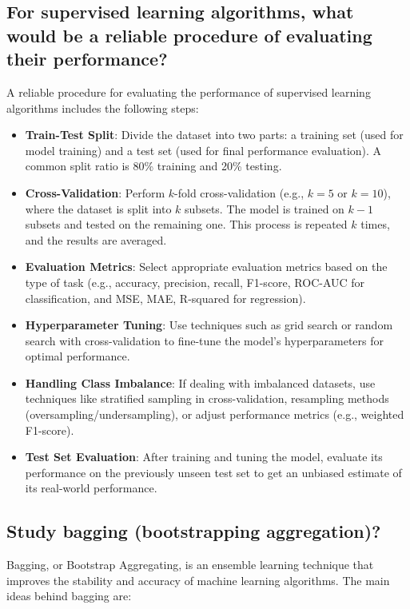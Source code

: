 \subsection{For supervised learning algorithms, what would be a reliable procedure of evaluating their performance?}

A reliable procedure for evaluating the performance of supervised learning algorithms includes the following steps:
\begin{itemize}
    \item \textbf{Train-Test Split}: Divide the dataset into two parts: a training set (used for model training) and a test set (used for final performance evaluation). A common split ratio is 80\% training and 20\% testing.
    \item \textbf{Cross-Validation}: Perform $k$-fold cross-validation (e.g., $k=5$ or $k=10$), where the dataset is split into $k$ subsets. The model is trained on $k-1$ subsets and tested on the remaining one. This process is repeated $k$ times, and the results are averaged.
    \item \textbf{Evaluation Metrics}: Select appropriate evaluation metrics based on the type of task (e.g., accuracy, precision, recall, F1-score, ROC-AUC for classification, and MSE, MAE, R-squared for regression).
    \item \textbf{Hyperparameter Tuning}: Use techniques such as grid search or random search with cross-validation to fine-tune the model's hyperparameters for optimal performance.
    \item \textbf{Handling Class Imbalance}: If dealing with imbalanced datasets, use techniques like stratified sampling in cross-validation, resampling methods (oversampling/undersampling), or adjust performance metrics (e.g., weighted F1-score).
    \item \textbf{Test Set Evaluation}: After training and tuning the model, evaluate its performance on the previously unseen test set to get an unbiased estimate of its real-world performance.
\end{itemize}


\subsection{Study bagging (bootstrapping aggregation)?}

Bagging, or Bootstrap Aggregating, is an ensemble learning technique that improves the stability and accuracy of machine learning algorithms. The main ideas behind bagging are:

